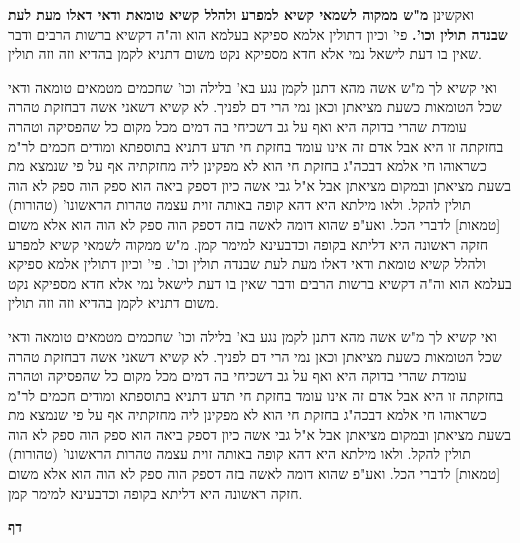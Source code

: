 \documentclass[12pt, openany]{book}
\newcommand{\sethebfont}{
\fontsize{10.5pt}{21.0pt} \selectfont
}
\newcommand{\twocol}[1]{
	{\sethebfont \begin{multicols}{2}
			#1
	\end{multicols}}	
}
\newcommand{\chapname}{}
\newcommand{\newchap}[1]{
	\addcontentsline{toc}{chapter}{#1}
	\renewcommand{\chapname}{#1}
		\begin{center}
			\textbf{%
\fontsize{16pt}{16pt}\selectfont
				#1}
		\end{center}
}
\begin{document}
\twocol{ואקשינן \textbf{מ"ש ממקוה לשמאי קשיא למפרע ולהלל קשיא טומאת ודאי דאלו מעת לעת שבנדה תולין וכו'.}  פי' וכיון דתולין אלמא ספיקא בעלמא הוא וה"ה דקשיא ברשות הרבים ודבר שאין בו דעת לישאל נמי אלא חדא מספיקא נקט משום דתניא לקמן בהדיא וזה וזה תולין.\par  ואי קשיא לך מ"ש אשה מהא דתנן לקמן נגע בא' בלילה וכו' שחכמים מטמאים טומאה ודאי שכל הטומאות כשעת מציאתן וכאן נמי הרי דם לפניך. לא קשיא דשאני אשה דבחזקת טהרה עומדת שהרי בדוקה היא ואף על גב דשכיחי בה דמים מכל מקום כל שהפסיקה וטהרה בחזקתה זו היא אבל אדם זה אינו עומד בחזקת חי תדע דתניא בתוספתא ומודים חכמים לר"מ כשראוהו חי אלמא דבכה"ג בחזקת חי הוא לא מפקינן ליה מחזקתיה אף על פי שנמצא מת בשעת מציאתן ובמקום מציאתן אבל א"ל גבי אשה כיון דספק ביאה הוא ספק הוה ספק לא הוה תולין להקל. ולאו מילתא היא דהא קופה באותה זוית עצמה טהרות הראשונו' (טהורות) [טמאות] לדברי הכל. ואע"פ שהוא דומה לאשה בזה דספק הוה ספק לא הוה הוא אלא משום חזקה ראשונה היא דליתא בקופה וכדבעינא למימר קמן. מ"ש ממקוה לשמאי קשיא למפרע ולהלל קשיא טומאת ודאי דאלו מעת לעת שבנדה תולין וכו'. פי' וכיון דתולין אלמא ספיקא בעלמא הוא וה"ה דקשיא ברשות הרבים ודבר שאין בו דעת לישאל נמי אלא חדא מספיקא נקט משום דתניא לקמן בהדיא וזה וזה תולין.\par  ואי קשיא לך מ"ש אשה מהא דתנן לקמן נגע בא' בלילה וכו' שחכמים מטמאים טומאה ודאי שכל הטומאות כשעת מציאתן וכאן נמי הרי דם לפניך. לא קשיא דשאני אשה דבחזקת טהרה עומדת שהרי בדוקה היא ואף על גב דשכיחי בה דמים מכל מקום כל שהפסיקה וטהרה בחזקתה זו היא אבל אדם זה אינו עומד בחזקת חי תדע דתניא בתוספתא ומודים חכמים לר"מ כשראוהו חי אלמא דבכה"ג בחזקת חי הוא לא מפקינן ליה מחזקתיה אף על פי שנמצא מת בשעת מציאתן ובמקום מציאתן אבל א"ל גבי אשה כיון דספק ביאה הוא ספק הוה ספק לא הוה תולין להקל. ולאו מילתא היא דהא קופה באותה זוית עצמה טהרות הראשונו' (טהורות) [טמאות] לדברי הכל. ואע"פ שהוא דומה לאשה בזה דספק הוה ספק לא הוה הוא אלא משום חזקה ראשונה היא דליתא בקופה וכדבעינא למימר קמן. 
\par}
\newchap{דף }
\end{document}
